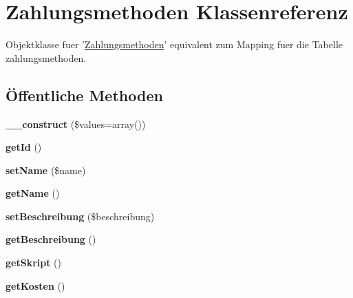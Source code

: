 \hypertarget{classZahlungsmethoden}{\section{\-Zahlungsmethoden \-Klassenreferenz}
\label{classZahlungsmethoden}
}


\-Objektklasse fuer '\hyperlink{classZahlungsmethoden}{\-Zahlungsmethoden}' equivalent zum \-Mapping fuer die \-Tabelle zahlungsmethoden.  


\subsection*{Öffentliche \-Methoden}
\begin{DoxyCompactItemize}
\item 
\hypertarget{classZahlungsmethoden_af0951bf1729ee841abbe630561017fba}{{\bfseries \-\_\-\-\_\-construct} (\$values=array())}\label{classZahlungsmethoden_af0951bf1729ee841abbe630561017fba}

\item 
\hypertarget{classZahlungsmethoden_ae0d76f1130f05fa8fbc36fbe81299515}{{\bfseries get\-Id} ()}\label{classZahlungsmethoden_ae0d76f1130f05fa8fbc36fbe81299515}

\item 
\hypertarget{classZahlungsmethoden_a4b88ed1a33fb388e80821142ed3f5075}{{\bfseries set\-Name} (\$name)}\label{classZahlungsmethoden_a4b88ed1a33fb388e80821142ed3f5075}

\item 
\hypertarget{classZahlungsmethoden_ac293e9efa518261beef99f7fe66baa7f}{{\bfseries get\-Name} ()}\label{classZahlungsmethoden_ac293e9efa518261beef99f7fe66baa7f}

\item 
\hypertarget{classZahlungsmethoden_a00260a23ec9f28434370f6099cd941f5}{{\bfseries set\-Beschreibung} (\$beschreibung)}\label{classZahlungsmethoden_a00260a23ec9f28434370f6099cd941f5}

\item 
\hypertarget{classZahlungsmethoden_a5ff345578e660aae9b8c01e777483489}{{\bfseries get\-Beschreibung} ()}\label{classZahlungsmethoden_a5ff345578e660aae9b8c01e777483489}

\item 
\hypertarget{classZahlungsmethoden_a5e9d6ee42554a7d2208858d5ac8f659a}{{\bfseries get\-Skript} ()}\label{classZahlungsmethoden_a5e9d6ee42554a7d2208858d5ac8f659a}

\item 
\hypertarget{classZahlungsmethoden_ad5a3f408c2b7a194b5b5a28952eab569}{{\bfseries get\-Kosten} ()}\label{classZahlungsmethoden_ad5a3f408c2b7a194b5b5a28952eab569}

\end{DoxyCompactItemize}



